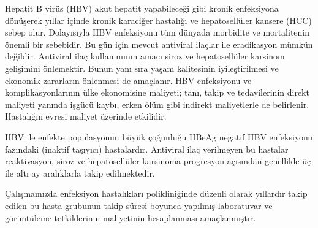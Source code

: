 
Hepatit B virüs (HBV) akut hepatit yapabileceği gibi kronik enfeksiyona dönüşerek yıllar içinde kronik karaciğer hastalığı ve hepatosellüler kansere (HCC) sebep olur. Dolayısıyla HBV enfeksiyonu tüm dünyada morbidite ve mortalitenin önemli bir sebebidir. Bu gün için mevcut antiviral ilaçlar ile eradikasyon mümkün değildir. Antiviral ilaç kullanımının amacı siroz ve hepatosellüler karsinom gelişimini önlemektir. Bunun yanı sıra yaşam kalitesinin iyileştirilmesi ve ekonomik zararların önlenmesi de amaçlanır. HBV enfeksiyonu ve komplikasyonlarının ülke ekonomisine maliyeti; tanı, takip ve tedavilerinin direkt maliyeti yanında işgücü kaybı, erken ölüm gibi indirekt maliyetlerle de belirlenir. Hastalığın evresi maliyet üzerinde etkilidir. 

HBV ile enfekte populasyonun büyük çoğunluğu HBeAg negatif HBV enfeksiyonu fazındaki (inaktif taşıyıcı) hastalardır. Antiviral ilaç verilmeyen bu hastalar reaktivasyon, siroz ve hepatosellüler karsinoma progresyon açısından genellikle üç ile altı ay aralıklarla takip edilmektedir.

Çalışmamızda enfeksiyon hastalıkları polikliniğinde düzenli olarak yıllardır takip edilen bu hasta grubunun takip süresi boyunca yapılmış laboratuvar ve görüntüleme tetkiklerinin maliyetinin hesaplanması amaçlanmıştır.























